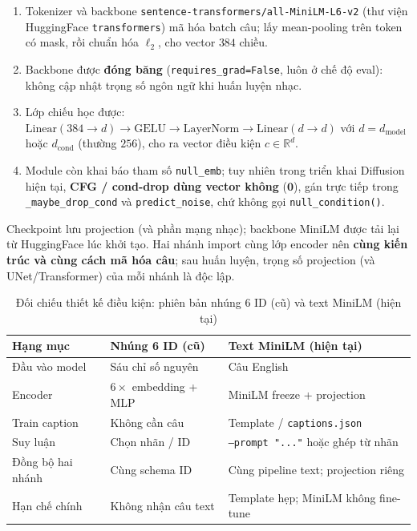 \begin{enumerate}
    \item Tokenizer và backbone \texttt{sentence-transformers/all-MiniLM-L6-v2} (thư viện HuggingFace \texttt{transformers}) mã hóa batch câu; lấy mean-pooling trên token có mask, rồi chuẩn hóa $\ell_2$, cho vector $384$ chiều.
    \item Backbone được \textbf{đóng băng} (\texttt{requires\_grad=False}, luôn ở chế độ eval): không cập nhật trọng số ngôn ngữ khi huấn luyện nhạc.
    \item Lớp chiếu học được: $\mathrm{Linear}(384\rightarrow d)\rightarrow\mathrm{GELU}\rightarrow\mathrm{LayerNorm}\rightarrow\mathrm{Linear}(d\rightarrow d)$ với $d=d_{\mathrm{model}}$ hoặc $d_{\mathrm{cond}}$ (thường $256$), cho ra vector điều kiện $c\in\mathbb{R}^{d}$.
    \item Module còn khai báo tham số \texttt{null\_emb}; tuy nhiên trong triển khai Diffusion hiện tại, \textbf{CFG / cond-drop dùng vector không} ($\mathbf{0}$), gán trực tiếp trong \texttt{\_maybe\_drop\_cond} và \texttt{predict\_noise}, chứ không gọi \texttt{null\_condition()}.
\end{enumerate}

Checkpoint lưu projection (và phần mạng nhạc); backbone MiniLM được tải lại từ HuggingFace lúc khởi tạo. Hai nhánh import cùng lớp encoder nên \textbf{cùng kiến trúc và cùng cách mã hóa câu}; sau huấn luyện, trọng số projection (và UNet/Transformer) của mỗi nhánh là độc lập.

\begin{table}[htbp]
\centering
\caption{Đối chiếu thiết kế điều kiện: phiên bản nhúng 6 ID (cũ) và text MiniLM (hiện tại)}
\label{tab:ch3-cond-evolution}
\small
\begin{tabular}{p{3.2cm}p{5.0cm}p{5.2cm}}
\toprule
\textbf{Hạng mục} & \textbf{Nhúng 6 ID (cũ)} & \textbf{Text MiniLM (hiện tại)} \\
\midrule
Đầu vào model & Sáu chỉ số nguyên & Câu English \\
Encoder & $6\times$ embedding + MLP & MiniLM freeze + projection \\
Train caption & Không cần câu & Template / \texttt{captions.json} \\
Suy luận & Chọn nhãn / ID & \texttt{--prompt "..."} hoặc ghép từ nhãn \\
Đồng bộ hai nhánh & Cùng schema ID & Cùng pipeline text; projection riêng \\
Hạn chế chính & Không nhận câu text & Template hẹp; MiniLM không fine-tune \\
\bottomrule
\end{tabular}
\end{table}

